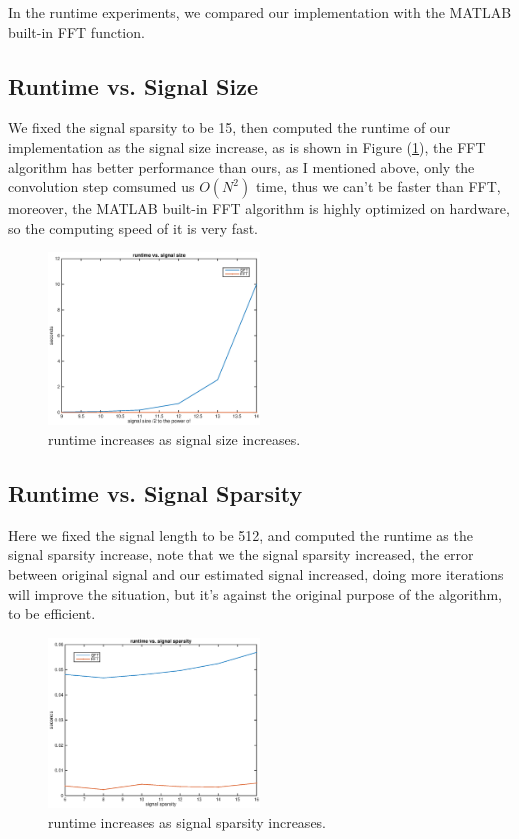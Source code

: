 \documentclass[journal,transmag]{IEEEtran}
\begin{document}
In the runtime experiments, we compared our implementation with the MATLAB built-in FFT function.

\subsection{Runtime vs. Signal Size}
We fixed the signal sparsity to be 15, then computed the runtime of our implementation as the signal size increase, as is shown in Figure (\ref{size}), the FFT algorithm has better performance than ours, as I mentioned above, only the convolution step comsumed us $O(N^2)$ time, thus we can't be faster than FFT, moreover, the MATLAB built-in FFT algorithm is highly optimized on hardware, so the computing speed of it is very fast.
\begin{figure}[htbp]
	\includegraphics[width=0.5\textwidth]{size}
	\caption{runtime increases as signal size increases.}
	\label{size}
\end{figure}

\subsection{Runtime vs. Signal Sparsity}
Here we fixed the signal length to be 512, and computed the runtime as the signal sparsity increase, note that we the signal sparsity increased, the error between original signal and our estimated signal increased, doing more iterations will improve the situation, but it's against the original purpose of the algorithm, to be efficient.
\begin{figure}[htbp]
	\includegraphics[width=0.5\textwidth]{sparsity}
	\caption{runtime increases as signal sparsity increases.}
	\label{sparsity}
\end{figure}
\end{document}

